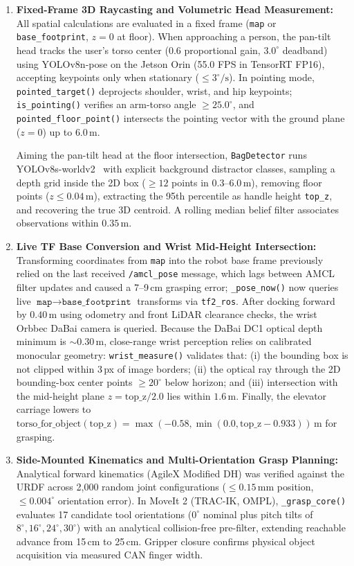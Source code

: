 \documentclass[runningheads,a4paper]{llncs}
\begin{document}
\begin{enumerate}
    \item \textbf{Fixed-Frame 3D Raycasting and Volumetric Head Measurement:} All spatial calculations are evaluated in a fixed frame (\texttt{map} or \texttt{base\_footprint}, $z=0$ at floor). When approaching a person, the pan-tilt head tracks the user's torso center ($0.6$ proportional gain, $3.0^\circ$ deadband) using YOLOv8n-pose on the Jetson Orin (55.0 FPS in TensorRT FP16), accepting keypoints only when stationary ($\le 3^\circ/\text{s}$). In pointing mode, \texttt{pointed\_target()} deprojects shoulder, wrist, and hip keypoints; \texttt{is\_pointing()} verifies an arm-torso angle $\ge 25.0^\circ$, and \texttt{pointed\_floor\_point()} intersects the pointing vector with the ground plane ($z=0$) up to $6.0\,\text{m}$.

    Aiming the pan-tilt head at the floor intersection, \texttt{BagDetector} runs YOLOv8s-worldv2~\cite{cheng2024yoloworld} with explicit background distractor classes, sampling a depth grid inside the 2D box ($\ge 12$ points in $0.3$--$6.0\,\text{m}$), removing floor points ($z \le 0.04\,\text{m}$), extracting the 95th percentile as handle height \texttt{top\_z}, and recovering the true 3D centroid. A rolling median belief filter associates observations within $0.35\,\text{m}$.

    \item \textbf{Live TF Base Conversion and Wrist Mid-Height Intersection:} Transforming coordinates from \texttt{map} into the robot base frame previously relied on the last received \texttt{/amcl\_pose} message, which lags between AMCL filter updates and caused a 7--9\,cm grasping error; \texttt{\_pose\_now()} now queries live $\texttt{map} \to \texttt{base\_footprint}$ transforms via \texttt{tf2\_ros}. After docking forward by $0.40\,\text{m}$ using odometry and front LiDAR clearance checks, the wrist Orbbec DaBai camera is queried. Because the DaBai DC1 optical depth minimum is $\sim 0.30\,\text{m}$, close-range wrist perception relies on calibrated monocular geometry: \texttt{wrist\_measure()} validates that: (i) the bounding box is not clipped within 3\,px of image borders; (ii) the optical ray through the 2D bounding-box center points $\ge 20^\circ$ below horizon; and (iii) intersection with the mid-height plane $z = \text{top\_z} / 2.0$ lies within $1.6\,\text{m}$. Finally, the elevator carriage lowers to $\text{torso\_for\_object}(\text{top\_z}) = \max(-0.58, \min(0.0, \text{top\_z} - 0.933))\,\text{m}$ for grasping.

    \item \textbf{Side-Mounted Kinematics and Multi-Orientation Grasp Planning:} Analytical forward kinematics (AgileX Modified DH) was verified against the URDF across 2,000 random joint configurations ($\le 0.15\,\text{mm}$ position, $\le 0.004^\circ$ orientation error). In MoveIt 2 (TRAC-IK, OMPL), \texttt{\_grasp\_core()} evaluates 17 candidate tool orientations ($0^\circ$ nominal plus pitch tilts of $8^\circ, 16^\circ, 24^\circ, 30^\circ$) with an analytical collision-free pre-filter, extending reachable advance from 15\,cm to 25\,cm. Gripper closure confirms physical object acquisition via measured CAN finger width.
\end{enumerate}
\end{document}
